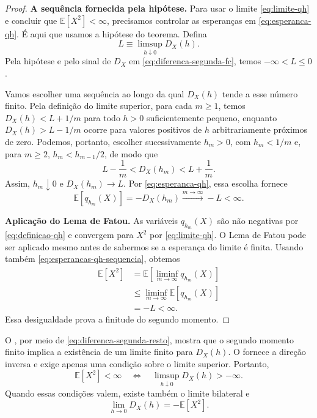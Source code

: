 \documentclass[12pt,portuguese]{article}
\theoremstyle{definition}
\theoremstyle{plainexercise}
\theoremstyle{starredexercise}
\theoremstyle{definition}
\begin{document}
\begin{proof}
\smallskip
\noindent\textbf{A sequência fornecida pela hipótese.}
Para usar o limite \eqref{eq:limite-qh} e concluir que
$\mathbb{E}[X^2]<\infty$, precisamos controlar as esperanças
em \eqref{eq:esperanca-qh}. É aqui que usamos a hipótese do teorema.
Defina
\[
L\equiv\limsup_{h\downarrow0}D_X(h).
\]
Pela hipótese e pelo sinal de $D_X$ em
\eqref{eq:diferenca-segunda-fc}, temos $-\infty<L\leqslant0$.

Vamos escolher uma sequência ao longo da qual $D_X(h)$ tende
a esse número finito. Pela definição do limite superior, para
cada $m\geqslant1$, temos $D_X(h)<L+1/m$ para todo $h>0$
suficientemente pequeno, enquanto $D_X(h)>L-1/m$ ocorre para
valores positivos de $h$ arbitrariamente próximos de zero.
Podemos, portanto, escolher sucessivamente $h_m>0$, com
$h_m<1/m$ e, para $m\geqslant2$, $h_m<h_{m-1}/2$, de modo que
\[
L-\frac{1}{m}<D_X(h_m)<L+\frac{1}{m}.
\]
Assim, $h_m\downarrow0$ e $D_X(h_m)\to L$.
Por \eqref{eq:esperanca-qh}, essa escolha fornece
\begin{equation}\label{eq:esperancas-qh-sequencia}
\mathbb{E}[q_{h_m}(X)]
=-D_X(h_m)\xrightarrow{m\to\infty}-L<\infty.
\end{equation}

\smallskip
\noindent\textbf{Aplicação do Lema de Fatou.}
As variáveis $q_{h_m}(X)$ são não negativas por
\eqref{eq:definicao-qh} e convergem para $X^2$ por
\eqref{eq:limite-qh}. O Lema de Fatou pode ser aplicado mesmo
antes de sabermos se a esperança do limite é finita.
Usando também \eqref{eq:esperancas-qh-sequencia}, obtemos
\begin{align*}
\mathbb{E}[X^2]
&=\mathbb{E}\left[\liminf_{m\to\infty}q_{h_m}(X)\right]
\\[0.3cm]
&\leqslant
\liminf_{m\to\infty}\mathbb{E}[q_{h_m}(X)]
\\[0.3cm]
&=-L<\infty.
\end{align*}
Essa desigualdade prova a finitude do segundo momento.
\end{proof}

O , por meio de
\eqref{eq:diferenca-segunda-resto}, mostra que o segundo momento
finito implica a existência de um limite finito para $D_X(h)$.
O  fornece a direção inversa
e exige apenas uma condição sobre o limite superior. Portanto,
\[
\mathbb{E}[X^2]<\infty
\quad\Longleftrightarrow\quad
\limsup_{h\downarrow0}D_X(h)>-\infty.
\]
Quando essas condições valem, existe também o limite bilateral e
\[
\lim_{h\to0}D_X(h)=-\mathbb{E}[X^2].
\]
\end{document}
